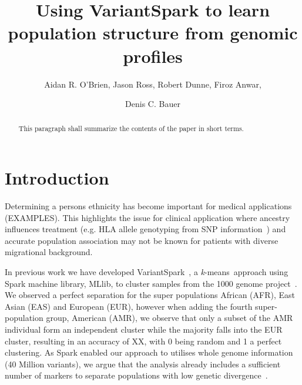 \documentclass{llncs}
\newcommand{\variantSpark}{{\sc VariantSpark}}
\newcommand{\kMeans}{\textit{k}-means}
\begin{document}
\setcounter{save}{\value{section}}
{\def\addtocontents#1#2{}%
\def\addcontentsline#1#2#3{}%
\def\markboth#1#2{}%
%
\title{Using VariantSpark to learn population structure from genomic profiles}

\author{Aidan R. O'Brien, Jason Ross, Robert Dunne, Firoz Anwar, \and Denis C. Bauer}


\maketitle
%
\begin{abstract}
This paragraph shall summarize the contents of the paper
in short terms.
\end{abstract}
%
\section{Introduction}
%

Determining a persons ethnicity has become important for medical applications (EXAMPLES). This highlights the issue for clinical application where ancestry influences treatment (e.g. HLA allele genotyping from SNP information~\cite{Zheng2014}) and accurate population association may not be known for patients with diverse migrational background.


In previous work we have developed \variantSpark~\cite{OBrien}, a \kMeans\ approach using {\sc Spark} machine library, {\sc MLlib}, to cluster samples from the 1000 genome project~\cite{1KG2012}.
We observed a perfect separation for the super populations African (AFR), East Asian (EAS) and European (EUR), however when adding the fourth super-population group, American (AMR), we observe that only a subset of the AMR individual form an independent cluster while the majority falls into the EUR cluster, resulting in an accuracy of XX, with 0 being random and 1 a perfect clustering.
As Spark enabled our approach to utilises whole genome information (40 Million variants), we argue that the analysis already includes a sufficient number of markers to separate populations with low genetic divergence~\cite{Patterson2006}. 

}
\end{document}
